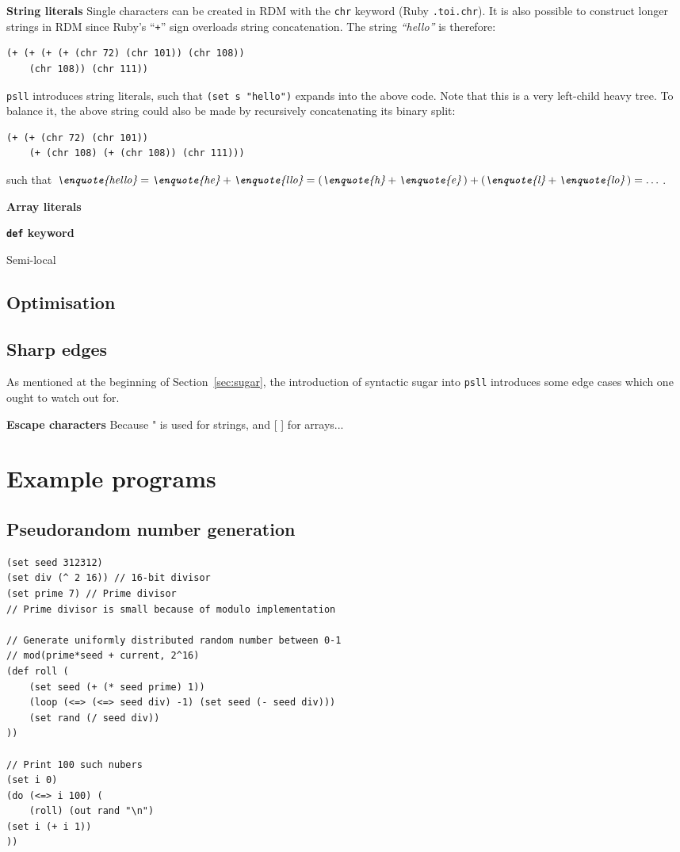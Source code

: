 \documentclass[aip,jcp,reprint,footinbib]{revtex4-1}
\let\tt\texttt
\newcommand\psll{\texttt{psll}\xspace}
\newcommand{\ilpsll}[1]{\lstinline[language=psll,columns=flexible]{#1}}
\begin{document}
\textbf{String literals} Single characters can be created in RDM with the \tt{chr} keyword (Ruby \tt{.to\textunderscore{}i.chr}). It is also possible to construct longer strings in RDM since Ruby's \enquote{\tt{+}} sign overloads string concatenation. The string \textit{\enquote{hello}} is therefore:
\begin{lstlisting}[language=psll,aboveskip=3pt,belowskip=-2pt]
(+ (+ (+ (+ (chr 72) (chr 101)) (chr 108))
	(chr 108)) (chr 111))
\end{lstlisting}
\psll introduces string literals, such that \ilpsll{(set s "hello")} expands into the above code. Note that this is a very left-child heavy tree. To balance it, the above string could also be made by recursively concatenating its binary split:
\begin{lstlisting}[language=psll,aboveskip=3pt,belowskip=-2pt]
(+ (+ (chr 72) (chr 101))
	(+ (chr 108) (+ (chr 108)) (chr 111)))
\end{lstlisting}
such that $\textit{\enquote{hello}} = \textit{\enquote{he}} + \textit{\enquote{llo}} = \left(\textit{\enquote{h}} + \textit{\enquote{e}}\,\right) + \left(\textit{\enquote{l}} + \textit{\enquote{lo}}\,\right) = \dots$.

\textbf{Array literals}

\textbf{\tt{def} keyword}

Semi-local
\subsection{Optimisation}

\subsection{Sharp edges}\label{sec:sharp_edges}
As mentioned at the beginning of Section~\ref{sec:sugar}, the introduction of syntactic sugar into \psll introduces some edge cases which one ought to watch out for.

\textbf{Escape characters}
Because " is used for strings, and [ ] for arrays...


\section{Example programs}
\subsection{Pseudorandom number generation}

\begin{lstlisting}[language=psll,aboveskip=3mm,belowskip=3mm]
(set seed 312312)
(set div (^ 2 16)) // 16-bit divisor
(set prime 7) // Prime divisor
// Prime divisor is small because of modulo implementation

// Generate uniformly distributed random number between 0-1
// mod(prime*seed + current, 2^16)
(def roll (
    (set seed (+ (* seed prime) 1))
    (loop (<=> (<=> seed div) -1) (set seed (- seed div)))
    (set rand (/ seed div))
))

// Print 100 such nubers
(set i 0)
(do (<=> i 100) (
    (roll) (out rand "\n")
(set i (+ i 1))
))
\end{lstlisting}
\end{document}
